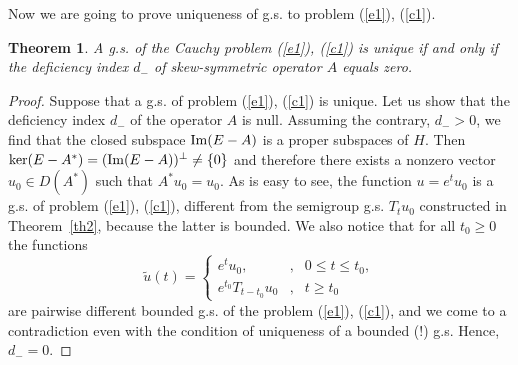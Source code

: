 \documentclass[12pt]{article}
\renewcommand{\Im}{\mathop{\rm Im}}
\numberwithin{equation}{section}
\theoremstyle{plain}
\newtheorem{theorem}{Theorem}[section]
\theoremstyle{definition}
\begin{document}
Now we are going to prove uniqueness of g.s. to problem  (\ref{e1}), (\ref{c1}).

\begin{theorem}\label{th4} A g.s. of the Cauchy problem (\ref{e1}), (\ref{c1}) is unique if and only if the deficiency index $d_-$ of skew-symmetric operator $A$ equals zero.
\end{theorem}

\begin{proof}
Suppose that a g.s. of problem (\ref{e1}), (\ref{c1}) is unique. Let us show that the deficiency index $d_-$ of the operator $A$ is null. Assuming the contrary, $d_->0$, we find that the closed subspace $\Im (E-A)$ is a proper subspaces of $H$. Then $\ker(E-A^*)=(\Im(E-A))^\perp\not=\{0\}$ and therefore there exists a nonzero vector $u_0\in D(A^*)$ such that  $A^*u_0=u_0$. As is easy to see, the function $u=e^t u_0$ is a g.s. of problem (\ref{e1}), (\ref{c1}), different from the semigroup g.s. $T_tu_0$ constructed in Theorem~\ref{th2}, because the latter is bounded. We also notice that for all $t_0\ge 0$ the functions
\[
\tilde u(t)=\left\{\begin{array}{lcr} e^tu_0, & , & 0\le t\le t_0, \\ e^{t_0}T_{t-t_0}u_0 & , & t\ge t_0 \end{array} \right.
\]
are pairwise different bounded g.s. of the problem (\ref{e1}), (\ref{c1}), and we come to a contradiction even with the condition of uniqueness of a bounded (!) g.s. Hence, $d_-=0$.


\end{proof}
\end{document}
